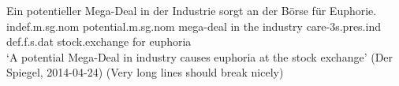 \ea
\gll Ein potentieller Mega-Deal in der Industrie sorgt an der B{\"o}rse f{\"u}r Euphorie.\\
     indef.m.sg.nom potential.m.sg.nom mega-deal in the industry care-3s.pres.ind def.f.s.dat stock.exchange for euphoria\\
\glt `A potential Mega-Deal in industry causes euphoria at the stock exchange' (Der Spiegel, 2014-04-24) (Very long lines should break nicely)
\z